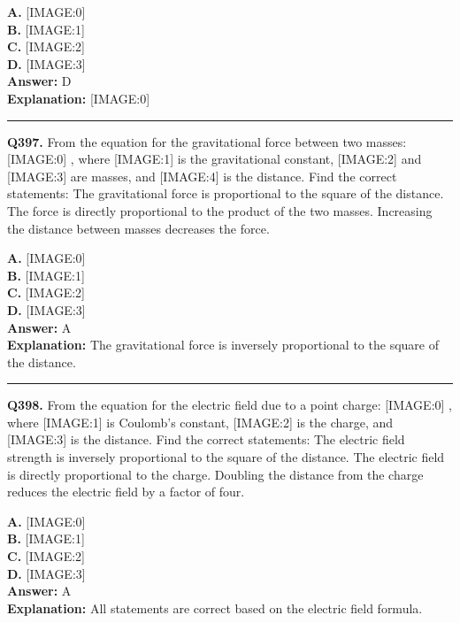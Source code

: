 \documentclass[12pt]{article}
\begin{document}
\textbf{A.} [IMAGE:0] \\
\textbf{B.} [IMAGE:1] \\
\textbf{C.} [IMAGE:2] \\
\textbf{D.} [IMAGE:3] \\

\textbf{Answer:} D \\
\textbf{Explanation:} [IMAGE:0]

\hrule
\vspace{1em}


\noindent
\textbf{Q397.} From the equation for the gravitational force between two masses:
[IMAGE:0]
, where
[IMAGE:1]
is the gravitational constant,
[IMAGE:2]
and
[IMAGE:3]
are masses, and
[IMAGE:4]
is the distance. Find the correct statements:
The gravitational force is proportional to the square of the distance.
The force is directly proportional to the product of the two masses.
Increasing the distance between masses decreases the force.



\textbf{A.} [IMAGE:0] \\
\textbf{B.} [IMAGE:1] \\
\textbf{C.} [IMAGE:2] \\
\textbf{D.} [IMAGE:3] \\

\textbf{Answer:} A \\
\textbf{Explanation:} The gravitational force is inversely proportional to the square of the distance.

\hrule
\vspace{1em}


\noindent
\textbf{Q398.} From the equation for the electric field due to a point charge:
[IMAGE:0]
, where
[IMAGE:1]
is Coulomb's constant,
[IMAGE:2]
is the charge, and
[IMAGE:3]
is the distance. Find the correct statements:
The electric field strength is inversely proportional to the square of the distance.
The electric field is directly proportional to the charge.
Doubling the distance from the charge reduces the electric field by a factor of four.



\textbf{A.} [IMAGE:0] \\
\textbf{B.} [IMAGE:1] \\
\textbf{C.} [IMAGE:2] \\
\textbf{D.} [IMAGE:3] \\

\textbf{Answer:} A \\
\textbf{Explanation:} All statements are correct based on the electric field formula.
\end{document}
